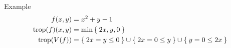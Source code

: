 \documentclass{beamer}
\DeclareMathOperator{\trop}{trop}
\newcommand{\R}{\ensuremath{\mathbb{R}}}
\begin{document}

\begin{frame}{Example}
    \begin{align}
        f(x,y) & = x^2 + y - 1 \\
        \trop(f)(x,y) & = \min \Set{ 2x, y, 0 } \\
        \trop(V(f)) & = \Set{ 2x = y \leq 0 } \cup \Set{ 2x = 0 \leq y } \cup \Set{ y = 0 \leq 2x }
    \end{align}
    \begin{adjustbox}{max totalsize={\textwidth}{.66\textheight},center}
    \end{adjustbox}
\end{frame}



\end{document}
